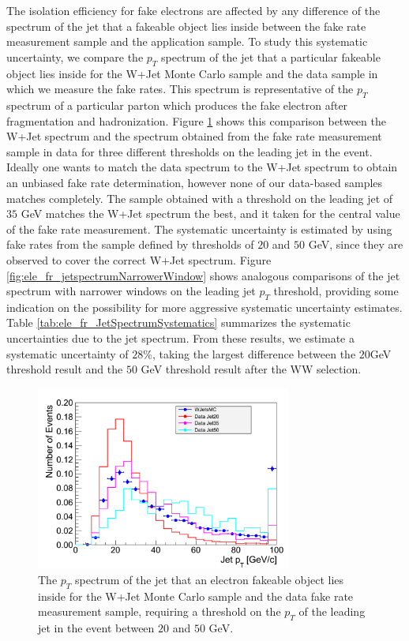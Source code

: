 The isolation efficiency for fake electrons are affected by any difference of the spectrum of the
jet that a fakeable object lies inside between the fake rate measurement sample and the 
application sample. To study this systematic uncertainty, we compare the $p_{T}$ spectrum 
of the jet that a particular fakeable object lies inside for the W+Jet Monte Carlo sample and the
data sample in which we measure the fake rates. This spectrum is representative of the $p_{T}$
spectrum of a particular parton which produces the fake electron after fragmentation and 
hadronization. Figure \ref{fig:ele_fr_jetspectrum20To50} shows this comparison between the W+Jet spectrum and the
spectrum obtained from the fake rate measurement sample in data for three different 
thresholds on the leading jet in the event. Ideally one wants to match the data spectrum to the
W+Jet spectrum to obtain an unbiased fake rate determination, however none of our data-based
samples matches completely. The sample obtained with a threshold on the leading jet of
$35$ GeV matches the W+Jet spectrum the best, and it taken for the central value of the 
fake rate measurement. The systematic uncertainty is estimated by using fake rates from the sample 
defined by thresholds of $20$ and $50$ GeV, since they are observed to cover the 
correct W+Jet spectrum. Figure \ref{fig:ele_fr_jetspectrumNarrowerWindow} shows analogous 
comparisons of the jet spectrum with narrower windows on the leading jet $p_{T}$ threshold,
providing some indication on the possibility for more aggressive systematic uncertainty 
estimates. Table \ref{tab:ele_fr_JetSpectrumSystematics} summarizes the systematic
uncertainties due to the jet spectrum. From these results, we estimate a systematic uncertainty 
of $28\%$, taking the largest difference between the $20$GeV threshold result and the $50$ GeV 
threshold result after the WW selection.

\begin{figure}[!htbp]
\begin{center}
\includegraphics[width=0.75\textwidth]{figures/LeptonJetPt_ElectronV4_20To50.pdf}
\caption{The $p_{T}$ spectrum of the jet that an electron fakeable object lies inside for the 
W+Jet Monte Carlo sample and the data fake rate measurement sample, requiring a threshold on the $p_{T}$ of 
the leading jet in the event between $20$ and $50$ GeV.}
\label{fig:ele_fr_jetspectrum20To50}
\end{center}
\end{figure}

